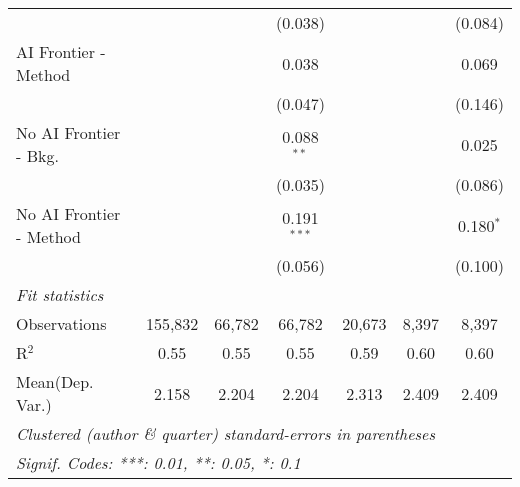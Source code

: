 \begin{tabular}{lcccccc}
                           &               &               & (0.038)       &               &               & (0.084)\\   
   AI Frontier - Method    &               &               & 0.038         &               &               & 0.069\\   
                           &               &               & (0.047)       &               &               & (0.146)\\   
   No AI Frontier - Bkg.   &               &               & 0.088$^{**}$  &               &               & 0.025\\   
                           &               &               & (0.035)       &               &               & (0.086)\\   
   No AI Frontier - Method &               &               & 0.191$^{***}$ &               &               & 0.180$^{*}$\\   
                           &               &               & (0.056)       &               &               & (0.100)\\   
   \midrule
   \emph{Fit statistics}\\
   Observations            & 155,832       & 66,782        & 66,782        & 20,673        & 8,397         & 8,397\\  
   R$^2$                   & 0.55          & 0.55          & 0.55          & 0.59          & 0.60          & 0.60\\  
Mean(Dep. Var.) & 2.158 & 2.204 & 2.204 & 2.313 & 2.409 & 2.409 \\
   \midrule \midrule
   \multicolumn{7}{l}{\emph{Clustered (author \& quarter) standard-errors in parentheses}}\\
   \multicolumn{7}{l}{\emph{Signif. Codes: ***: 0.01, **: 0.05, *: 0.1}}\\
\end{tabular}
\par\endgroup
